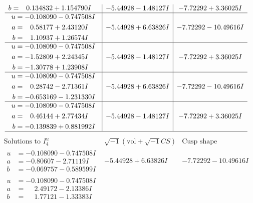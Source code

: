 \documentclass[1p]{elsarticle_modified}
\theoremstyle{definition}
\newcommand{\I}{\sqrt{-1}}
\begin{document}
$$\begin{array}{c|c|c}
\begin{aligned}
b &= \phantom{-}0.134832 + 1.154790 I\end{aligned}
 & -5.44928 - 1.48127 I & -7.72292 + 3.36025 I \\ \hline\begin{aligned}
u &= -0.108090 - 0.747508 I \\
a &= \phantom{-}0.58177 + 2.43120 I \\
b &= \phantom{-}1.10937 + 1.26574 I\end{aligned}
 & -5.44928 + 6.63826 I & -7.72292 - 10.49616 I \\ \hline\begin{aligned}
u &= -0.108090 - 0.747508 I \\
a &= -1.52809 + 2.24345 I \\
b &= -1.30778 + 1.23908 I\end{aligned}
 & -5.44928 - 1.48127 I & -7.72292 + 3.36025 I \\ \hline\begin{aligned}
u &= -0.108090 - 0.747508 I \\
a &= \phantom{-}0.28742 - 2.71361 I \\
b &= -0.653169 - 1.231330 I\end{aligned}
 & -5.44928 + 6.63826 I & -7.72292 - 10.49616 I \\ \hline\begin{aligned}
u &= -0.108090 - 0.747508 I \\
a &= \phantom{-}0.46144 + 2.77434 I \\
b &= -0.139839 + 0.881992 I\end{aligned}
 & -5.44928 - 1.48127 I & -7.72292 + 3.36025 I\\
 \hline 
 \end{array}$$\newpage$$\begin{array}{c|c|c}  
\text{Solutions to }I^u_{4}& \I (\text{vol} + \sqrt{-1}CS) & \text{Cusp shape}\\
 \hline 
\begin{aligned}
u &= -0.108090 - 0.747508 I \\
a &= -0.80607 - 2.71119 I \\
b &= -0.069757 - 0.589599 I\end{aligned}
 & -5.44928 + 6.63826 I & -7.72292 - 10.49616 I \\ \hline\begin{aligned}
u &= -0.108090 - 0.747508 I \\
a &= \phantom{-}2.49172 - 2.13386 I \\
b &= \phantom{-}1.77121 - 1.33383 I\end{aligned}

\end{array}$$
\end{document}
